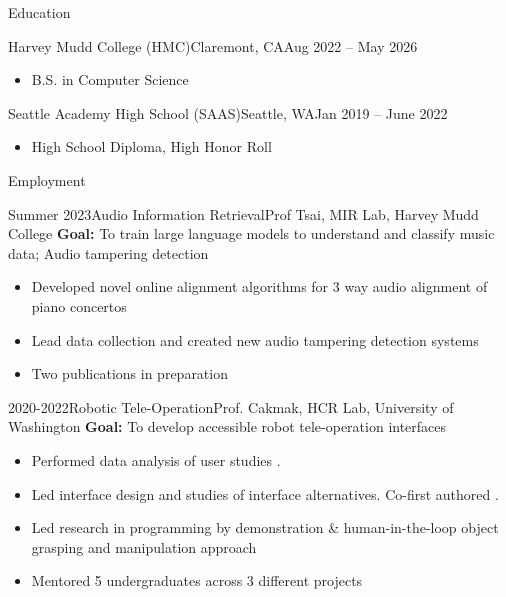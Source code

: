 \documentclass[]{mcdowellcv}
\begin{document}
\makeheader


\begin{cvsection}{Education}
	\begin{cvsubsection}{Harvey Mudd College (HMC)}{Claremont, CA}{Aug 2022 -- May 2026}
		\begin{itemize}
			\item B.S. in Computer Science%
		\end{itemize}
	\end{cvsubsection}
	\begin{cvsubsection}{Seattle Academy High School (SAAS)}{Seattle, WA}{Jan 2019 -- June 2022}
		\begin{itemize}
			\item High School Diploma, High Honor Roll%
		\end{itemize}
	\end{cvsubsection}
\end{cvsection}

\begin{cvsection}{Employment}
	\begin{cvsubsection}{Summer 2023}{Audio Information Retrieval}{Prof Tsai, MIR Lab, Harvey Mudd College}
		\textbf{Goal:} To train large language models to understand and classify music data; Audio tampering detection
		\begin{itemize}
			\item Developed novel online alignment algorithms for 3 way audio alignment of piano concertos
			\item Lead data collection and created new audio tampering detection systems
			\item Two publications in preparation
		\end{itemize}
	\end{cvsubsection}
	\begin{cvsubsection}{2020-2022}{Robotic Tele-Operation}{Prof. Cakmak, HCR Lab, University of Washington}
		\textbf{Goal:} To develop accessible robot tele-operation interfaces
		\begin{itemize}
			\item Performed data analysis of user studies .
			\item Led interface design and studies of interface alternatives. Co-first authored  .
			\item Led research in programming by demonstration \& human-in-the-loop object grasping and manipulation approach
			\item Mentored 5 undergraduates across 3 different projects
		\end{itemize}
	\end{cvsubsection}
\end{cvsection}
\end{document}
